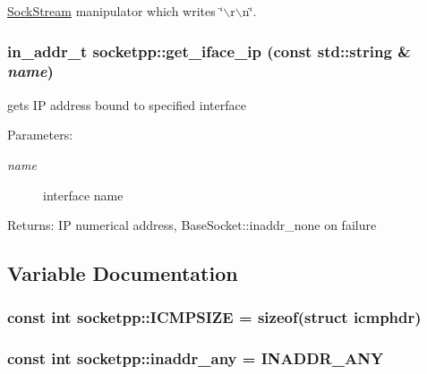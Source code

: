 \hyperlink{classsocketpp_1_1SockStream}{SockStream} manipulator which writes \char`\"{}$\backslash$r$\backslash$n\char`\"{}. 

\hypertarget{namespacesocketpp_e04237b3f443ecc14051f52a59450692}{
\subsubsection[{get\_\-iface\_\-ip}]{\setlength{\rightskip}{0pt plus 5cm}in\_\-addr\_\-t socketpp::get\_\-iface\_\-ip (const std::string \& {\em name})}}
\label{namespacesocketpp_e04237b3f443ecc14051f52a59450692}


gets IP address bound to specified interface 

\begin{Desc}
\item[Parameters:]
\begin{description}
\item[{\em name}]interface name \end{description}
\end{Desc}
\begin{Desc}
\item[Returns:]IP numerical address, BaseSocket::inaddr\_\-none on failure \end{Desc}


\subsection{Variable Documentation}
\hypertarget{namespacesocketpp_fa361b148e87f58b86a95abc48e281fb}{
\subsubsection[{ICMPSIZE}]{\setlength{\rightskip}{0pt plus 5cm}const int {\bf socketpp::ICMPSIZE} = sizeof(struct {\bf icmphdr})}}
\label{namespacesocketpp_fa361b148e87f58b86a95abc48e281fb}


\hypertarget{namespacesocketpp_5200e43bde971e8003068a622cba2f58}{
\subsubsection[{inaddr\_\-any}]{\setlength{\rightskip}{0pt plus 5cm}const int {\bf socketpp::inaddr\_\-any} = INADDR\_\-ANY}}
\label{namespacesocketpp_5200e43bde971e8003068a622cba2f58}


